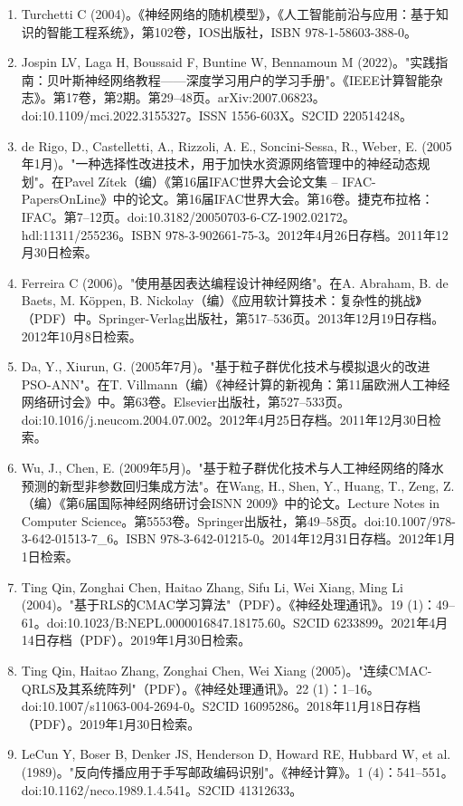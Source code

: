 \begin{enumerate}
\item Turchetti C (2004)。《神经网络的随机模型》，《人工智能前沿与应用：基于知识的智能工程系统》，第102卷，IOS出版社，ISBN 978-1-58603-388-0。
\item Jospin LV, Laga H, Boussaid F, Buntine W, Bennamoun M (2022)。"实践指南：贝叶斯神经网络教程——深度学习用户的学习手册"。《IEEE计算智能杂志》。第17卷，第2期。第29–48页。arXiv:2007.06823。doi:10.1109/mci.2022.3155327。ISSN 1556-603X。S2CID 220514248。
\item de Rigo, D., Castelletti, A., Rizzoli, A. E., Soncini-Sessa, R., Weber, E. (2005年1月)。"一种选择性改进技术，用于加快水资源网络管理中的神经动态规划"。在Pavel Zítek（编）《第16届IFAC世界大会论文集 – IFAC-PapersOnLine》中的论文。第16届IFAC世界大会。第16卷。捷克布拉格：IFAC。第7–12页。doi:10.3182/20050703-6-CZ-1902.02172。hdl:11311/255236。ISBN 978-3-902661-75-3。2012年4月26日存档。2011年12月30日检索。
\item Ferreira C (2006)。"使用基因表达编程设计神经网络"。在A. Abraham, B. de Baets, M. Köppen, B. Nickolay（编）《应用软计算技术：复杂性的挑战》（PDF）中。Springer-Verlag出版社，第517–536页。2013年12月19日存档。2012年10月8日检索。
\item Da, Y., Xiurun, G. (2005年7月)。"基于粒子群优化技术与模拟退火的改进PSO-ANN"。在T. Villmann（编）《神经计算的新视角：第11届欧洲人工神经网络研讨会》中。第63卷。Elsevier出版社，第527–533页。doi:10.1016/j.neucom.2004.07.002。2012年4月25日存档。2011年12月30日检索。
\item Wu, J., Chen, E. (2009年5月)。"基于粒子群优化技术与人工神经网络的降水预测的新型非参数回归集成方法"。在Wang, H., Shen, Y., Huang, T., Zeng, Z.（编）《第6届国际神经网络研讨会ISNN 2009》中的论文。Lecture Notes in Computer Science。第5553卷。Springer出版社，第49–58页。doi:10.1007/978-3-642-01513-7_6。ISBN 978-3-642-01215-0。2014年12月31日存档。2012年1月1日检索。
\item Ting Qin, Zonghai Chen, Haitao Zhang, Sifu Li, Wei Xiang, Ming Li (2004)。"基于RLS的CMAC学习算法"（PDF）。《神经处理通讯》。19 (1)：49–61。doi:10.1023/B:NEPL.0000016847.18175.60。S2CID 6233899。2021年4月14日存档（PDF）。2019年1月30日检索。
\item Ting Qin, Haitao Zhang, Zonghai Chen, Wei Xiang (2005)。"连续CMAC-QRLS及其系统阵列"（PDF）。《神经处理通讯》。22 (1)：1–16。doi:10.1007/s11063-004-2694-0。S2CID 16095286。2018年11月18日存档（PDF）。2019年1月30日检索。
\item LeCun Y, Boser B, Denker JS, Henderson D, Howard RE, Hubbard W, et al. (1989)。"反向传播应用于手写邮政编码识别"。《神经计算》。1 (4)：541–551。doi:10.1162/neco.1989.1.4.541。S2CID 41312633。

\end{enumerate}
